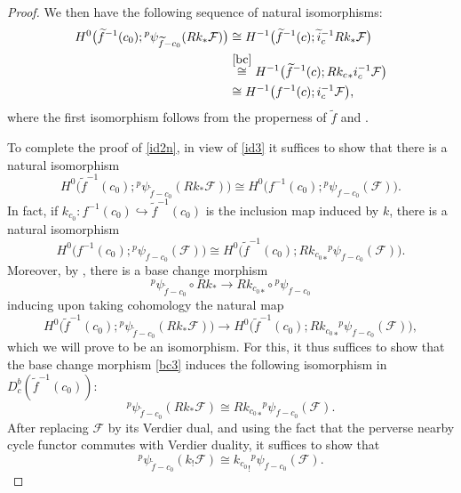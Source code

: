 \documentclass[12pt,leqno,twoside]{amsart}
\theoremstyle{plain}
\theoremstyle{definition}
\newcommand{\sF}{\mathcal{F}}
\begin{document}
\begin{proof}
We then have the following sequence of natural isomorphisms:
\begin{equation}\label{id3}
\begin{split}
H^0\big({\widetilde{f}}^{-1}(c_0); {^p}\psi_{\widetilde{f}-c_0}(Rk_*\sF)\big) &\cong H^{-1}\big({\widetilde{f}}^{-1}(c); {{\widetilde i}_c}^{-1}Rk_*\sF\big) \\
& \overset{\eqref{bc}}{\cong} H^{-1}\big({\widetilde{f}}^{-1}(c); R{k_c}_*i_c^{-1}\sF\big) \\
& \cong H^{-1}\big(f^{-1}(c); i_c^{-1}\sF\big),
\end{split}
\end{equation}
where the first isomorphism follows from the properness of $\widetilde{f}$ and \cite[Example 10.4.20]{MS}.

To complete the proof of \eqref{id2n}, in view of \eqref{id3}  it suffices to show that there is a natural isomorphism
\begin{equation}\label{id3h}
H^0\big(\widetilde{f}^{-1}(c_0); {^p}\psi_{\widetilde{f}-c_0}(Rk_*\sF)\big) \cong H^{0}\big(f^{-1}(c_0); {^p}\psi_{f-c_0}(\sF)\big).
\end{equation}
In fact, if $k_{c_0}\colon f^{-1}(c_0) \hookrightarrow \widetilde{f}^{-1}(c_0)$ is the inclusion map induced by $k$, there is a natural isomorphism
\begin{equation}\label{id4h}
H^{0}\big(f^{-1}(c_0); {^p}\psi_{f-c_0}(\sF)\big) \cong H^0\big(\widetilde{f}^{-1}(c_0); R{k_{c_0}}_*{^p}\psi_{f-c_0}(\sF)\big). 
\end{equation}
Moreover, by \cite[Remark 4.3.7 (3)]{Sch}, there is a base change morphism 
\begin{equation}\label{bc3} {^p}\psi_{\widetilde{f}-c_0}\circ Rk_*\to R{k_{c_0}}_*\circ {^p}\psi_{f-c_0}\end{equation}
 inducing upon taking cohomology the natural map 
\begin{equation}\label{eq+3}
H^0\big(\widetilde{f}^{-1}(c_0); {^p}\psi_{\widetilde{f}-c_0}(Rk_*\sF)\big)  \to H^0\big(\widetilde{f}^{-1}(c_0); R{k_{c_0}}_*{^p}\psi_{f-c_0}(\sF)\big),
\end{equation}
which we will prove to be an isomorphism. 
For this, it thus suffices to show that the base change morphism \eqref{bc3} induces 
the following isomorphism in $D^b_c(\widetilde{f}^{-1}(c_0))$:
\begin{equation}\label{id4}
{^p}\psi_{\widetilde{f}-c_0}(Rk_*\sF) \cong R{k_{c_0}}_*{^p}\psi_{f-c_0}(\sF).
\end{equation}
After replacing $\sF$ by its Verdier dual, and using the fact that the perverse nearby cycle functor commutes with Verdier duality, it suffices to show that
\begin{equation}\label{id5}
{^p}\psi_{\widetilde{f}-c_0}(k_!\sF) \cong {k_{c_0}}_!{^p}\psi_{f-c_0}(\sF).
\end{equation}


\end{proof}
\end{document}
